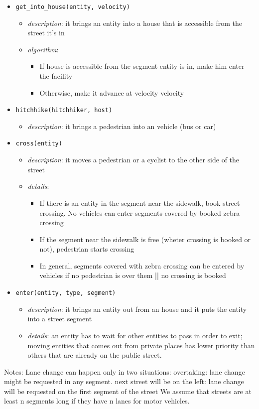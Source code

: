 \begin{itemize}
\begin{itemize}
	\end{itemize}
		\item \texttt{get\_into\_house(entity, velocity)}
	\begin{itemize}
		\item \textit{description}: it brings an entity into a house that is accessible from the street it’s in
		\item \textit{algorithm}:
		\begin{itemize}
			\item If house is accessible from the segment entity is in, make him enter the facility
			\item Otherwise, make it advance at velocity velocity
		\end{itemize}
	\end{itemize}
	\item \texttt{hitchhike(hitchhiker, host)}
	\begin{itemize}
		\item \textit{description}: it brings a pedestrian into an vehicle (bus or car)
	\end{itemize}
	\item \texttt{cross(entity)}
	\begin{itemize}
		\item \textit{description}: it moves a pedestrian or a cyclist to the other side of the street
		\item \textit{details}:
		\begin{itemize}
			\item If there is an entity in the segment near the sidewalk, book street crossing. No vehicles can enter segments covered by booked zebra crossing
			\item If the segment near the sidewalk is free (wheter crossing is booked or not), pedestrian starts crossing
			\item In general, segments covered with zebra crossing can be entered by vehicles if no pedestrian is over them || no crossing is booked
		\end{itemize}
	\end{itemize}
	\item \texttt{enter(entity, type, segment)}
	\begin{itemize}
		\item \textit{description}: it brings an entity out from an house and it puts the entity into a street segment
		\item \textit{details}: an entity has to wait for other entities to pass in order to exit; moving entities that comes out from private places has lower priority than others that are already on the public street.
	\end{itemize}
\end{itemize}
Notes: 
Lane change can happen only in two situations:
overtaking: lane change might be requested in any segment.
next street will be on the left: lane change will be requested on the first segment of the street
We assume that streets are at least n segments long if they have n lanes for motor vehicles.